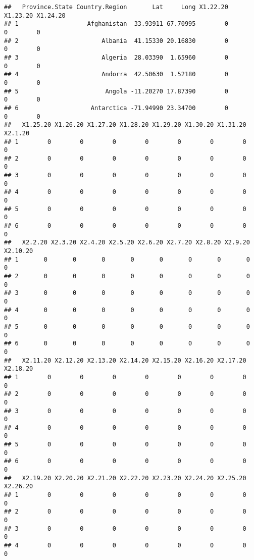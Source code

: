 \documentclass[
]{article}
\begin{document}
\begin{verbatim}
##   Province.State Country.Region       Lat     Long X1.22.20 X1.23.20 X1.24.20
## 1                   Afghanistan  33.93911 67.70995        0        0        0
## 2                       Albania  41.15330 20.16830        0        0        0
## 3                       Algeria  28.03390  1.65960        0        0        0
## 4                       Andorra  42.50630  1.52180        0        0        0
## 5                        Angola -11.20270 17.87390        0        0        0
## 6                    Antarctica -71.94990 23.34700        0        0        0
##   X1.25.20 X1.26.20 X1.27.20 X1.28.20 X1.29.20 X1.30.20 X1.31.20 X2.1.20
## 1        0        0        0        0        0        0        0       0
## 2        0        0        0        0        0        0        0       0
## 3        0        0        0        0        0        0        0       0
## 4        0        0        0        0        0        0        0       0
## 5        0        0        0        0        0        0        0       0
## 6        0        0        0        0        0        0        0       0
##   X2.2.20 X2.3.20 X2.4.20 X2.5.20 X2.6.20 X2.7.20 X2.8.20 X2.9.20 X2.10.20
## 1       0       0       0       0       0       0       0       0        0
## 2       0       0       0       0       0       0       0       0        0
## 3       0       0       0       0       0       0       0       0        0
## 4       0       0       0       0       0       0       0       0        0
## 5       0       0       0       0       0       0       0       0        0
## 6       0       0       0       0       0       0       0       0        0
##   X2.11.20 X2.12.20 X2.13.20 X2.14.20 X2.15.20 X2.16.20 X2.17.20 X2.18.20
## 1        0        0        0        0        0        0        0        0
## 2        0        0        0        0        0        0        0        0
## 3        0        0        0        0        0        0        0        0
## 4        0        0        0        0        0        0        0        0
## 5        0        0        0        0        0        0        0        0
## 6        0        0        0        0        0        0        0        0
##   X2.19.20 X2.20.20 X2.21.20 X2.22.20 X2.23.20 X2.24.20 X2.25.20 X2.26.20
## 1        0        0        0        0        0        0        0        0
## 2        0        0        0        0        0        0        0        0
## 3        0        0        0        0        0        0        0        0
## 4        0        0        0        0        0        0        0        0

\end{verbatim}
\end{document}
